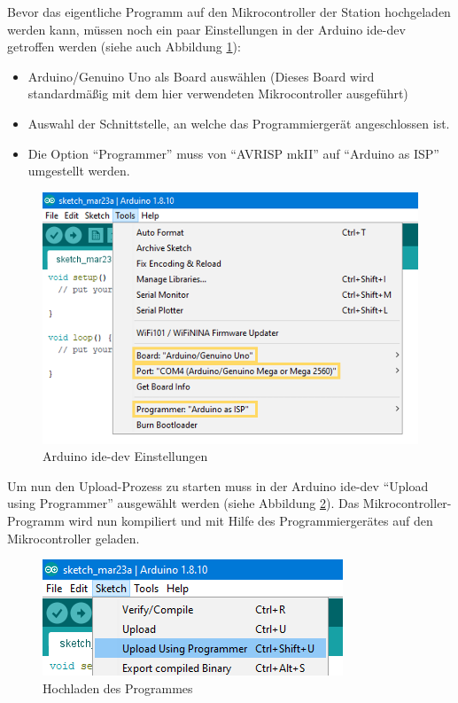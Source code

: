 Bevor das eigentliche Programm auf den Mikrocontroller der Station hochgeladen werden kann, müssen noch ein paar Einstellungen in der Arduino \ac{ide-dev} getroffen werden (siehe auch Abbildung \ref{fig:arduino-options}):
\begin{itemize}
    \item Arduino/Genuino Uno als Board auswählen (Dieses Board wird standardmäßig mit dem hier verwendeten Mikrocontroller ausgeführt)
    \item Auswahl der Schnittstelle, an welche das Programmiergerät angeschlossen ist.
    \item Die Option \enquote{Programmer} muss von \enquote{AVRISP mkII} auf \enquote{Arduino as ISP} umgestellt werden.
\end{itemize}
\begin{figure}[htbp!]
    \centering
    \includegraphics[width=.9\linewidth]{images/hardware-programmierung/optionen.png}
    \caption{Arduino \ac{ide-dev} Einstellungen}
    \label{fig:arduino-options}
\end{figure}

Um nun den Upload-Prozess zu starten muss in der Arduino \ac{ide-dev} \enquote{Upload using Programmer} ausgewählt werden (siehe Abbildung \ref{fig:arduino-upload}).
Das Mikrocontroller-Programm wird nun kompiliert und mit Hilfe des Programmiergerätes auf den Mikrocontroller geladen.
\begin{figure}[htbp!]
    \centering
\includegraphics[width=.7\linewidth]{images/hardware-programmierung/upload.png}
    \caption{Hochladen des Programmes}
    \label{fig:arduino-upload}
\end{figure}

